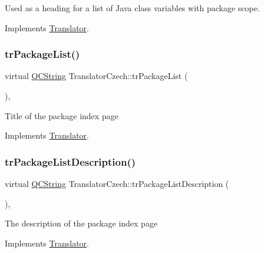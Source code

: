 Used as a heading for a list of Java class variables with package scope. 

Implements \mbox{\hyperlink{class_translator}{Translator}}.

\mbox{\label{class_translator_czech_a31aa53b59b50e4f818158b1ed61a351e}} 
\subsubsection{\texorpdfstring{trPackageList()}{trPackageList()}}
{\footnotesize\ttfamily virtual \mbox{\hyperlink{class_q_c_string}{Q\+C\+String}} Translator\+Czech\+::tr\+Package\+List (\begin{DoxyParamCaption}{ }\end{DoxyParamCaption})\hspace{0.3cm}{\ttfamily [inline]}, {\ttfamily [virtual]}}

Title of the package index page 

Implements \mbox{\hyperlink{class_translator}{Translator}}.

\mbox{\label{class_translator_czech_a7f9a5cb82348d25cc39c6bd6a27fa68b}} 
\subsubsection{\texorpdfstring{trPackageListDescription()}{trPackageListDescription()}}
{\footnotesize\ttfamily virtual \mbox{\hyperlink{class_q_c_string}{Q\+C\+String}} Translator\+Czech\+::tr\+Package\+List\+Description (\begin{DoxyParamCaption}{ }\end{DoxyParamCaption})\hspace{0.3cm}{\ttfamily [inline]}, {\ttfamily [virtual]}}

The description of the package index page 

Implements \mbox{\hyperlink{class_translator}{Translator}}.

\mbox{\label{class_translator_czech_a37d1d9bee84d6f8b69b5c08282551039}} 
